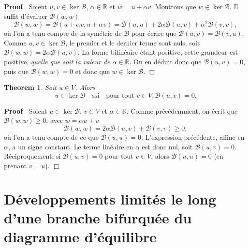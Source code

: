 \documentclass{article}
\newenvironment{proof}{\noindent\textbf{Proof\ }}{\hspace*{\fill}$\Box$\medskip}
\newtheorem{theorem}{Theorem}
\begin{document}
\begin{proof}
  Soient $u, v \in \ker \mathcal{B}$, $\alpha \in \mathbb{R}$ et $w = u +
  \alpha v$. Montrons que $w \in \ker \mathcal{B}$. Il suffit d'{\'e}valuer
  $\mathcal{B} (w, w)$
  \begin{equation}
    \mathcal{B} (w, w) =\mathcal{B} (u + \alpha v, u + \alpha v) =\mathcal{B}
    (u, u) + 2 \alpha \mathcal{B} (u, v) + \alpha^2 \mathcal{B} (v, v),
  \end{equation}
  o{\`u} l'on a tenu compte de la sym{\'e}trie de $\mathcal{B}$ pour
  {\'e}crire que $\mathcal{B} (u, v) =\mathcal{B} (v, u)$. Comme $u, v \in
  \ker \mathcal{B}$, le premier et le dernier terme sont nuls, soit
  $\mathcal{B} (w, w) = 2 \alpha \mathcal{B} (u, v)$. La forme bilin{\'e}aire
  {\'e}tant positive, cette grandeur est positive, \emph{quelle que soit la
  valeur de $\alpha \in \mathbb{R}$}. On en d{\'e}duit donc que $\mathcal{B}
  (u, v) = 0$, puis que $\mathcal{B} (w, w) = 0$ et donc que $w \in \ker
  \mathcal{B}.$
\end{proof}

\begin{theorem}
  Soit $u \in V$. Alors
  \begin{equation}
    u \in \ker \mathcal{B} \quad \text{ssi} \quad \text{pour tout } v \in V,
    \mathcal{B} (u, v) = 0.
  \end{equation}
\end{theorem}

\begin{proof}
  Soient $u \in \ker \mathcal{B}$, $v \in V$ et $\alpha \in \mathbb{R}$. Comme
  pr{\'e}c{\'e}demment, on {\'e}crit que $\mathcal{B} (w, w) \geq 0$, avec $w
  = \alpha u + v$
  \begin{equation}
    \mathcal{B} (w, w) = 2 \alpha \mathcal{B} (u, v) +\mathcal{B} (v, v) \geq
    0,
  \end{equation}
  o{\`u} l'on a tenu compte de ce que $\mathcal{B} (u, u) = 0$. L'expression
  pr{\'e}c{\'e}dente, affine en $\alpha$, a un signe constant. Le terme
  lin{\'e}aire en $\alpha$ est donc nul, soit $\mathcal{B} (u, v) = 0$.
  R{\'e}ciproquement, si $\mathcal{B} (u, v) = 0$ pour tout $v \in V$, alors
  $\mathcal{B} (u, u) = 0$ (en prenant $v = u$).
\end{proof}

\section{D{\'e}veloppements limit{\'e}s le long d'une branche bifurqu{\'e}e du
diagramme d'{\'e}quilibre}
\end{document}
